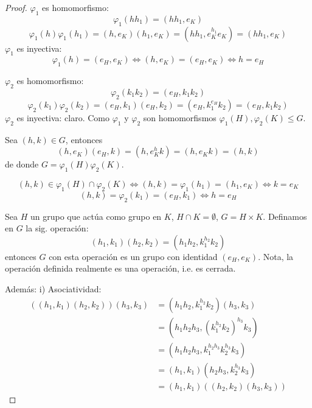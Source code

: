 \begin{proof}
	$\varphi_1$ es homomorfismo:
	\begin{equation*}
		\varphi_1(h h_1) = (h h_1, e_K)
	\end{equation*}
	\begin{equation*}
		\varphi_1(h) \varphi_1(h_1) = (h, e_K)(h_1, e_K) = (h h_1, e_K^{h_1} e_K) = (h h_1, e_K)
	\end{equation*}
	$\varphi_1$ es inyectiva:
	\begin{equation*}
		\varphi_1(h) = (e_H, e_K) \iff (h, e_K) = (e_H, e_K) \iff h = e_H
	\end{equation*}


	$\varphi_2$ es homomorfismo:
	\begin{equation*}
		\varphi_2(k_1 k_2) = (e_H, k_1 k_2)
	\end{equation*}
	\begin{equation*}
		\varphi_2(k_1) \varphi_2(k_2) = (e_H, k_1)(e_H, k_2) = (e_H, k_1^{e_H} k_2) = (e_H, k_1 k_2)
	\end{equation*}
	$\varphi_2$ es inyectiva: claro. Como $\varphi_1$ y $\varphi_2$ son homomorfismos $\varphi_1(H), \varphi_2(K) \le G$.

	Sea $(h, k) \in G$, entonces
	\begin{equation*}
		(h, e_K)(e_H, k) = (h, e_K^h k) = (h, e_K k) = (h, k)
	\end{equation*}
	de donde $G = \varphi_1(H) \varphi_2(K)$.

	\begin{equation*}
		(h, k) \in \varphi_1(H) \cap \varphi_2(K) \iff (h, k) = \varphi_1(h_1) = (h_1, e_K) \iff k=e_K
	\end{equation*}
	\begin{equation*}
		(h, k) = \varphi_2(k_1) = (e_H, k_1) \iff h=e_H
	\end{equation*}

	Sea $H$ un grupo que actúa como grupo en $K$, $H \cap K = \emptyset$, $G = H \times K$.
	Definamos en $G$ la sig. operación:
	\begin{equation*}
		(h_1, k_1)(h_2, k_2) = (h_1 h_2, k_1^{h_2} k_2)
	\end{equation*}
	entonces $G$ con esta operación es un grupo con identidad $(e_H, e_K)$.
	Nota, la operación definida realmente es una operación, i.e. es cerrada.

	Además:
	i) Asociatividad:
	\begin{align*}
		((h_1, k_1)(h_2, k_2))(h_3, k_3) & = (h_1 h_2, k_1^{h_2} k_2)(h_3, k_3)         \\
		                                 & = (h_1 h_2 h_3, (k_1^{h_2} k_2)^{h_3} k_3)   \\
		                                 & = (h_1 h_2 h_3, k_1^{h_2 h_3} k_2^{h_3} k_3) \\
		                                 & = (h_1, k_1)(h_2 h_3, k_2^{h_3} k_3)         \\
		                                 & = (h_1, k_1)((h_2, k_2)(h_3, k_3))
	\end{align*}



\end{proof}
